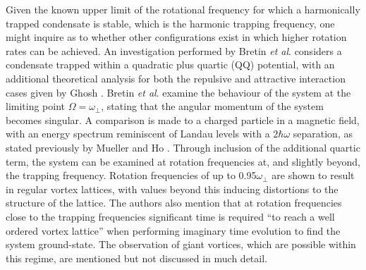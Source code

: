 
Given the known upper limit of the rotational frequency for which a harmonically trapped condensate is stable, which is the harmonic trapping frequency, one might inquire as to whether other configurations exist in which higher rotation rates can be achieved. An investigation performed by Bretin \textit{et al}. \cite{BEC:Bretin_prl_2004} considers a condensate trapped within a quadratic plus quartic (QQ) potential, with an additional theoretical analysis for both the repulsive and attractive interaction cases given by Ghosh \cite{Vtx:Ghosh_pra_2004}.
Bretin \textit{et al}. examine the behaviour of the system at the limiting point $\Omega=\omega_{\perp}$, stating that the angular momentum of the system
becomes singular. A comparison is made to a charged particle in a magnetic field, with an energy spectrum reminiscent of Landau levels with a $2\hbar\omega$ separation, as stated previously by Mueller and Ho \cite{Vtx:Mueller_prl_2002}. Through inclusion of the additional quartic term, the system can be examined at rotation frequencies at, and slightly beyond, the trapping frequency. Rotation frequencies of up to 0.95$\omega_{\perp}$ are shown to result in regular vortex lattices, with values beyond this inducing distortions to the structure of the lattice. The authors also mention that at rotation frequencies close to the trapping frequencies significant time is required ``to reach a well ordered vortex lattice'' when performing imaginary time evolution to find the system ground-state. The observation of giant vortices, which are possible within this regime, are mentioned but not discussed in much detail.

